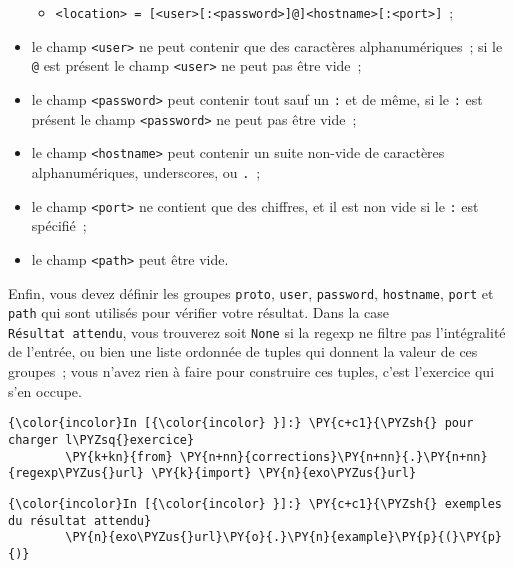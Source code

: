 \begin{itemize}
  \begin{itemize}
  \tightlist
  \item
    \texttt{\textless{}location\textgreater{}\ =\ {[}\textless{}user\textgreater{}{[}:\textless{}password\textgreater{}{]}@{]}\textless{}hostname\textgreater{}{[}:\textless{}port\textgreater{}{]}}~;
  \end{itemize}
\item
  le champ \texttt{\textless{}user\textgreater{}} ne peut contenir que
  des caractères alphanumériques~; si le \texttt{@} est présent le champ
  \texttt{\textless{}user\textgreater{}} ne peut pas être vide~;
\item
  le champ \texttt{\textless{}password\textgreater{}} peut contenir tout
  sauf un \texttt{:} et de même, si le \texttt{:} est présent le champ
  \texttt{\textless{}password\textgreater{}} ne peut pas être vide~;
\item
  le champ \texttt{\textless{}hostname\textgreater{}} peut contenir un
  suite non-vide de caractères alphanumériques, underscores, ou
  \texttt{.}~;
\item
  le champ \texttt{\textless{}port\textgreater{}} ne contient que des
  chiffres, et il est non vide si le \texttt{:} est spécifié~;
\item
  le champ \texttt{\textless{}path\textgreater{}} peut être vide.
\end{itemize}

Enfin, vous devez définir les groupes \texttt{proto}, \texttt{user},
\texttt{password}, \texttt{hostname}, \texttt{port} et \texttt{path} qui
sont utilisés pour vérifier votre résultat. Dans la case
\texttt{Résultat\ attendu}, vous trouverez soit \texttt{None} si la
regexp ne filtre pas l'intégralité de l'entrée, ou bien une liste
ordonnée de tuples qui donnent la valeur de ces groupes~; vous n'avez
rien à faire pour construire ces tuples, c'est l'exercice qui s'en
occupe.

    \begin{Verbatim}[commandchars=\\\{\}]
{\color{incolor}In [{\color{incolor} }]:} \PY{c+c1}{\PYZsh{} pour charger l\PYZsq{}exercice}
        \PY{k+kn}{from} \PY{n+nn}{corrections}\PY{n+nn}{.}\PY{n+nn}{regexp\PYZus{}url} \PY{k}{import} \PY{n}{exo\PYZus{}url}
\end{Verbatim}


    \begin{Verbatim}[commandchars=\\\{\}]
{\color{incolor}In [{\color{incolor} }]:} \PY{c+c1}{\PYZsh{} exemples du résultat attendu}
        \PY{n}{exo\PYZus{}url}\PY{o}{.}\PY{n}{example}\PY{p}{(}\PY{p}{)}
\end{Verbatim}


